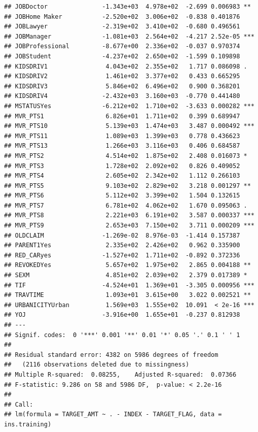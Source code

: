 \documentclass[]{article}
\begin{document}
\begin{verbatim}
## JOBDoctor               -1.343e+03  4.978e+02  -2.699 0.006983 ** 
## JOBHome Maker           -2.520e+02  3.006e+02  -0.838 0.401876    
## JOBLawyer               -2.319e+02  3.410e+02  -0.680 0.496561    
## JOBManager              -1.081e+03  2.564e+02  -4.217 2.52e-05 ***
## JOBProfessional         -8.677e+00  2.336e+02  -0.037 0.970374    
## JOBStudent              -4.237e+02  2.650e+02  -1.599 0.109898    
## KIDSDRIV1                4.043e+02  2.355e+02   1.717 0.086098 .  
## KIDSDRIV2                1.461e+02  3.377e+02   0.433 0.665295    
## KIDSDRIV3                5.846e+02  6.496e+02   0.900 0.368201    
## KIDSDRIV4               -2.432e+03  3.160e+03  -0.770 0.441480    
## MSTATUSYes              -6.212e+02  1.710e+02  -3.633 0.000282 ***
## MVR_PTS1                 6.826e+01  1.711e+02   0.399 0.689947    
## MVR_PTS10                5.139e+03  1.474e+03   3.487 0.000492 ***
## MVR_PTS11                1.089e+03  1.399e+03   0.778 0.436623    
## MVR_PTS13                1.266e+03  3.116e+03   0.406 0.684587    
## MVR_PTS2                 4.514e+02  1.875e+02   2.408 0.016073 *  
## MVR_PTS3                 1.728e+02  2.092e+02   0.826 0.409052    
## MVR_PTS4                 2.605e+02  2.342e+02   1.112 0.266103    
## MVR_PTS5                 9.103e+02  2.829e+02   3.218 0.001297 ** 
## MVR_PTS6                 5.112e+02  3.399e+02   1.504 0.132615    
## MVR_PTS7                 6.781e+02  4.062e+02   1.670 0.095063 .  
## MVR_PTS8                 2.221e+03  6.191e+02   3.587 0.000337 ***
## MVR_PTS9                 2.653e+03  7.150e+02   3.711 0.000209 ***
## OLDCLAIM                -1.269e-02  8.976e-03  -1.414 0.157387    
## PARENT1Yes               2.335e+02  2.426e+02   0.962 0.335900    
## RED_CARyes              -1.527e+02  1.711e+02  -0.892 0.372336    
## REVOKEDYes               5.657e+02  1.975e+02   2.865 0.004188 ** 
## SEXM                     4.851e+02  2.039e+02   2.379 0.017389 *  
## TIF                     -4.524e+01  1.369e+01  -3.305 0.000956 ***
## TRAVTIME                 1.093e+01  3.615e+00   3.022 0.002521 ** 
## URBANICITYUrban          1.569e+03  1.555e+02  10.091  < 2e-16 ***
## YOJ                     -3.916e+00  1.655e+01  -0.237 0.812938    
## ---
## Signif. codes:  0 '***' 0.001 '**' 0.01 '*' 0.05 '.' 0.1 ' ' 1
## 
## Residual standard error: 4382 on 5986 degrees of freedom
##   (2116 observations deleted due to missingness)
## Multiple R-squared:  0.08255,    Adjusted R-squared:  0.07366 
## F-statistic: 9.286 on 58 and 5986 DF,  p-value: < 2.2e-16
## 
## Call:
## lm(formula = TARGET_AMT ~ . - INDEX - TARGET_FLAG, data = ins.training)

\end{verbatim}
\end{document}
